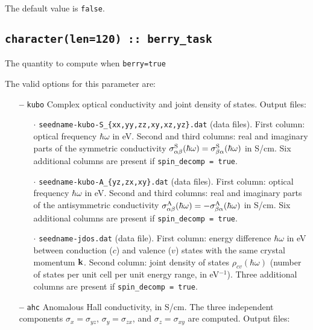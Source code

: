 The default value is \verb#false#.


\subsection[berry\_task]{\tt character(len=120) ::  berry\_task}
The quantity to compute when {\tt berry=true}

The valid options for this parameter are:

\begin{itemize}


\item[{\bf --}] \verb#kubo# Complex optical conductivity and joint
  density of states. Output files:

\begin{itemize}

\item[$\cdot$] {\tt seedname-kubo-S\_{\{xx,yy,zz,xy,xz,yz\}.dat}}
  (data files).  First column: optical frequency $\hbar\omega$ in
  eV. Second and third columns: real and imaginary parts of the
  symmetric conductivity $\sigma^{\rm
    S}_{\alpha\beta}(\hbar\omega)=\sigma^{\rm
    S}_{\beta\alpha}(\hbar\omega)$ in S/cm. Six additional columns are
  present if {\tt spin\_decomp = true}.

\item[$\cdot$] {\tt seedname-kubo-A\_{\{yz,zx,xy\}.dat}} (data files).
  First column: optical frequency $\hbar\omega$ in eV. Second and
  third columns: real and imaginary parts of the antisymmetric
  conductivity $\sigma^{\rm A}_{\alpha\beta}(\hbar\omega)=-\sigma^{\rm
    A}_{\beta\alpha}(\hbar\omega)$ in S/cm. Six additional columns are
  present if {\tt spin\_decomp = true}.


\item[$\cdot$] {\tt seedname-jdos.dat} (data file).  First column:
  energy difference $\hbar\omega$ in eV between conduction ($c$) and
  valence ($v$) states with the same crystal momentum ${\bf
    k}$. Second column: joint density of states
  $\rho_{cv}(\hbar\omega)$ (number of states per unit cell per unit
  energy range, in eV$^{-1}$). Three additional columns are present if
  {\tt spin\_decomp = true}.


\end{itemize}

\item[{\bf --}] \verb#ahc# Anomalous Hall conductivity, in S/cm.  The
  three independent components $\sigma_x=\sigma_{yz}$,
  $\sigma_y=\sigma_{zx}$, and $\sigma_z=\sigma_{xy}$ are
  computed. Output files:


\end{itemize}

